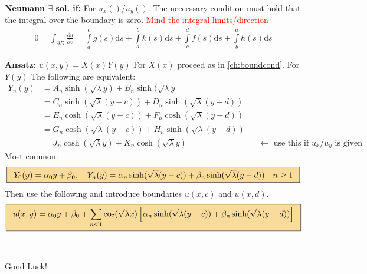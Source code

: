 \documentclass[10pt,landscape]{scrartcl}
\newcommand{\eqbox}[1]{\fcolorbox{black}{formula}{\hspace{0.5em}$\displaystyle#1$\hspace{0.5em}}}
\newcommand{\Int}{\int\limits}
\newcommand\warning{%
 \makebox[1.4em][c]{%
 \makebox[0pt][c]{\raisebox{.1em}{\small!}}%
 \makebox[0pt][c]{\color{red}\Large$\bigtriangleup$}}}%
\begin{document}
\begin{multicols*}{2}
\textbf{Neumann $\exists$ sol. if:} For $u_x()/u_y()$. The neccessary condition must hold that the integral over the boundary is zero. \warning\textcolor{red}{Mind the integral limits/direction}
  \begin{align*}
      0 = \int_{\partial D} \frac{\partial u}{\partial v} = 
      \Int^c_dg(s)\mathrm{d}s+ \Int^b_ak(s)\mathrm{d}s+\Int^d_cf(s)\mathrm{d}s+ \Int^a_bh(s)\mathrm{d}s
  \end{align*}

\textbf{Ansatz:} $u(x,y)=X(x)Y(y)$ For $X(x)$ proceed as in \ref{ch:boundcond}. For $Y(y)$ The following are equivalent:
  \begin{align*}
    Y_n(y) &= A_n \sinh(\sqrt{\lambda}y) + B_n \sinh(\sqrt{\lambda}y & &\\
           &= C_n \sinh(\sqrt{\lambda}(y-c)) + D_n \sinh(\sqrt{\lambda}(y-d)) & &\\
           &= E_n \cosh(\sqrt{\lambda}(y-c)) + F_n \cosh(\sqrt{\lambda}(y-d)) & &\\
           &= G_n \cosh(\sqrt{\lambda}(y-c)) + H_n \sinh(\sqrt{\lambda}(y-d)) & &\\
           &= J_n \cosh(\sqrt{\lambda}y) + K_n \cosh(\sqrt{\lambda}y) & &\leftarrow\text{ use this if $u_x/u_y$ is given}
  \end{align*}
Most common:
\begin{align*}
  \eqbox{Y_0(y) = \alpha_0y+\beta_0, \quad Y_n(y) = \alpha_n \sinh(\sqrt{\lambda}(y-c)) + \beta_n \sinh(\sqrt{\lambda}(y-d)) \quad n \geq 1}
\end{align*}
Then use the following and introduce boundaries $u(x,c)$ and $u(x,d)$.
\begin{align*}
  \eqbox{u(x,y) = \alpha_0y+\beta_0+\sum_{n\leq1}\cos(\sqrt{\lambda}x)\left[\alpha_n\sinh(\sqrt{\lambda}(y-c))+\beta_n\sinh(\sqrt{\lambda}(y-d))\right]}
\end{align*}




\vspace*{\fill}
\rule{0.3\linewidth}{0.25pt}\\
Good Luck!
%
%
\end{multicols*}
\end{document}
